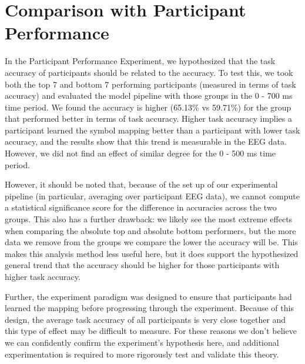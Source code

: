 \section{Comparison with Participant Performance}
In the Participant Performance Experiment, we hypothesized that the task 
accuracy of participants should be related to the \tvt accuracy. To test this, 
we took both the top 7 and bottom 7 performing participants (measured in terms 
of task accuracy) and evaluated the model pipeline with those groups in the 0 - 
700 ms time period.  We found the \tvt accuracy is higher (65.13\% vs 59.71\%) 
for the group that performed better in terms of task accuracy. Higher task 
accuracy implies a participant learned the symbol mapping better than a 
participant with lower task accuracy, and the \tvt results show that this trend 
is measurable in the EEG data.  However, we did not find an effect of similar 
degree for the 0 - 500 ms time period.

However, it should be noted that, because of the set up of our experimental 
pipeline (in particular, averaging over participant EEG data), we cannot 
compute a statistical significance score for the difference in \tvt accuracies 
across the two groups. This also has a further drawback: we likely see the most 
extreme effects when comparing the absolute top and absolute bottom performers, 
but the more data we remove from the groups we compare the lower the \tvt 
accuracy will be. This makes this analysis method less useful here, but it does 
support the hypothesized general trend that the \tvt accuracy should be higher 
for those participants with higher task accuracy.

Further, the experiment paradigm was designed to ensure that participants had 
learned the mapping before progressing through the experiment. Because of this 
design, the average task accuracy of all participants is very close together 
and this type of effect may be difficult to measure. For these reasons we don't 
believe we can confidently confirm the experiment's hypothesis here, and 
additional experimentation is required to more rigorously test and validate 
this theory.
